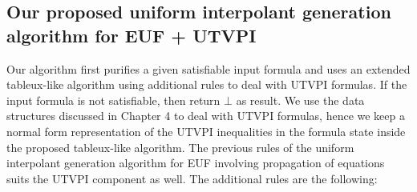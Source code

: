 \subsection{Our proposed uniform interpolant generation algorithm for EUF + UTVPI}

Our algorithm first purifies a given satisfiable input formula and 
uses an extended tableux-like algorithm
using additional rules to deal with UTVPI formulas. 
If the input formula is not satisfiable, 
then return $\bot$ as result. 
We use the data structures discussed in Chapter 4 to deal with UTVPI formulas,
hence we keep a normal form representation of the UTVPI inequalities in the
formula state inside the proposed tableux-like algorithm.
The previous rules of the uniform interpolant generation algorithm
for EUF involving propagation of equations suits the UTVPI component as well. 
The additional rules are the following:

